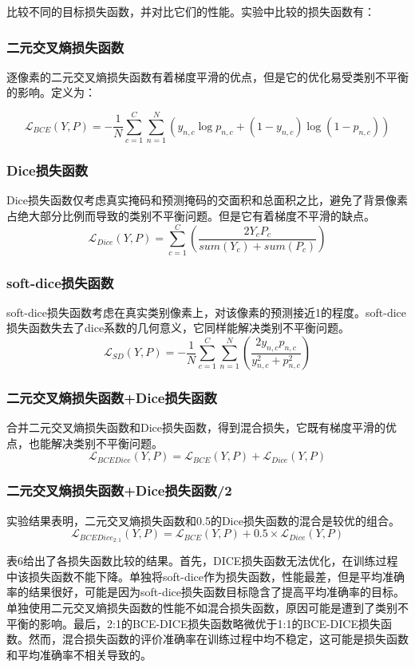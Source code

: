 \documentclass[letterpaper, 10pt, conference, twoside]{ieeeconf}
\begin{document}
比较不同的目标损失函数，并对比它们的性能。实验中比较的损失函数有：

\subsubsection{二元交叉熵损失函数}

逐像素的二元交叉熵损失函数有着梯度平滑的优点，但是它的优化易受类别不平衡的影响。定义为：

\[\mathcal{L}_{BCE}(Y,P)=-\frac{1}{N}\sum_{c=1}^{C}\sum_{n=1}^{N}(y_{n,c}\log p_{n,c}+(1-y_{n,c})\log (1-p_{n,c}))\]


\subsubsection{Dice损失函数}

Dice损失函数仅考虑真实掩码和预测掩码的交面积和总面积之比，避免了背景像素占绝大部分比例而导致的类别不平衡问题。但是它有着梯度不平滑的缺点。
\[\mathcal{L}_{Dice}(Y,P)=\sum_{c=1}^{C}(\frac{2Y_{c}P_{c}}{sum(Y_{c})+sum(P_{c})})\]


\subsubsection{soft-dice损失函数}

soft-dice损失函数\cite{c6}考虑在真实类别像素上，对该像素的预测接近1的程度。soft-dice损失函数失去了dice系数的几何意义，它同样能解决类别不平衡问题。
\[\mathcal{L}_{SD}(Y,P)=-\frac{1}{N}\sum_{c=1}^{C}\sum_{n=1}^{N}(\frac{2y_{n,c}p_{n,c}}{y_{n,c}^2+p_{n,c}^2})\]

\subsubsection{二元交叉熵损失函数+Dice损失函数}

合并二元交叉熵损失函数和Dice损失函数，得到混合损失，它既有梯度平滑的优点，也能解决类别不平衡问题。
\[\mathcal{L}_{BCEDice}(Y,P)=\mathcal{L}_{BCE}(Y,P)+\mathcal{L}_{Dice}(Y,P)\]

\subsubsection{二元交叉熵损失函数+Dice损失函数/2}
实验结果表明，二元交叉熵损失函数和0.5的Dice损失函数的混合是较优的组合。
\[\mathcal{L}_{BCEDice_{2:1}}(Y,P)=\mathcal{L}_{BCE}(Y,P)+0.5\times\mathcal{L}_{Dice}(Y,P)\]

表6给出了各损失函数比较的结果。首先，DICE损失函数无法优化，在训练过程中该损失函数不能下降。单独将soft-dice作为损失函数，性能最差，但是平均准确率的结果很好，可能是因为soft-dice损失函数目标隐含了提高平均准确率的目标。单独使用二元交叉熵损失函数的性能不如混合损失函数，原因可能是遭到了类别不平衡的影响。最后，2:1的BCE-DICE损失函数略微优于1:1的BCE-DICE损失函数。然而，混合损失函数的评价准确率在训练过程中均不稳定，这可能是损失函数和平均准确率不相关导致的。
\end{document}
